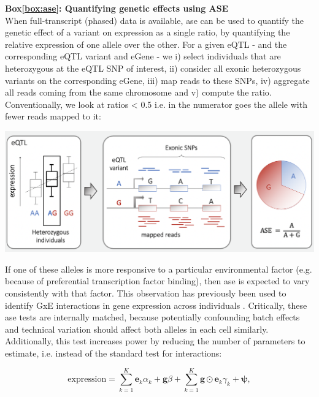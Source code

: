 \begin{Comment}
\hspace{-2.5mm}\textbf{Box\ref{box:ase}: Quantifying genetic effects using ASE}\label{box:ase}\\
\small
When full-transcript (phased) data is available, \gls{ase} can be used to quantify the genetic effect of a variant on expression as a single ratio, by quantifying the relative expression of one allele over the other.
For a given eQTL - and the corresponding eQTL variant and eGene -  we i) select individuals that are heterozygous at the eQTL SNP of interest, ii) consider all exonic heterozygous variants on the corresponding eGene, iii) map reads to these SNPs, iv) aggregate all reads coming from the same chromosome and v) compute the ratio. 
Conventionally, we look at ratios < 0.5 i.e. in the numerator goes the allele with fewer reads mapped to it:

\vspace{5mm}

\includegraphics[width=15cm]{Chapter4/Fig/ASE.png}

If one of these alleles is more responsive to a particular environmental factor (e.g. because of preferential transcription factor binding), then \gls{ase} is expected to vary consistently with that factor. 
This observation has previously been used to identify GxE interactions in gene expression across individuals \cite{knowles2017allele}. 
Critically, these \gls{ase} tests are internally matched, because potentially confounding batch effects and technical variation should affect both alleles in each cell similarly.
Additionally, this test increases power by reducing the number of parameters to estimate, i.e. instead of the standard test for interactions:  

\begin{equation*}
    \mathrm{expression} = \sum_{k=1}^{K} \mathbf{e}_k\alpha_k + \mathbf{g}\beta +
    \sum_{k=1}^{K} \mathbf{g} \odot \mathbf{e}_k\gamma_k + \boldsymbol{\psi},
\end{equation*}


\end{Comment}

